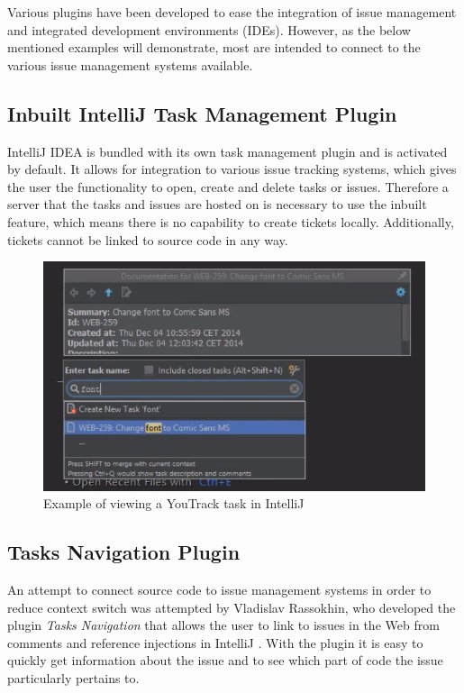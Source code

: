 \documentclass{4thYearProject}
\begin{document}
Various plugins have been developed to ease the integration of issue management and integrated development environments (IDEs). However, as the below mentioned examples will demonstrate, most are intended to connect to the various issue management systems available. 

\subsection{Inbuilt IntelliJ Task Management Plugin}

IntelliJ IDEA is bundled with its own task management plugin and is activated by default. It allows for integration to various issue tracking systems, which gives the user the functionality to open, create and delete tasks or issues. Therefore a server that the tasks and issues are hosted on is necessary to use the inbuilt feature, which means there is no capability to create tickets locally. Additionally, tickets cannot be linked to source code in any way.

\begin{figure}[H]
\includegraphics[scale=0.5]{IntelliJ_Tasks}
\centering
\caption{Example of viewing a YouTrack task in IntelliJ}\label{intellijtask}
\label{fig:intellijtask}
\end{figure}

\subsection{Tasks Navigation Plugin}

An attempt to connect source code to issue management systems in order to reduce context switch was attempted by Vladislav Rassokhin, who developed the plugin \textit{Tasks Navigation} that allows the user to link to issues in the Web from comments and reference injections in IntelliJ \cite{tasksnavigation}. With the plugin it is easy to quickly get information about the issue and to see which part of code the issue particularly pertains to. 
\end{document}

